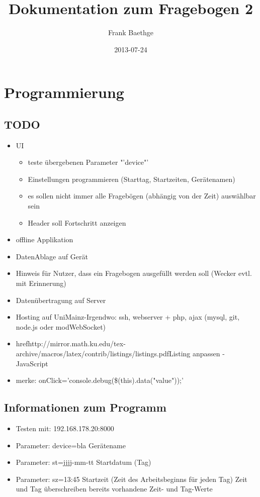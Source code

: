 \documentclass[a4paper]{scrartcl}
\title{Dokumentation zum Fragebogen 2}
\author{Frank Baethge}
\date{2013-07-24}
\begin{document}
	\section{Programmierung}

		\subsection{TODO}
			\begin{itemize}
				\item UI

					\begin{itemize}
						\item teste übergebenen Parameter "'device"'
						\item Einstellungen programmieren (Starttag, Startzeiten, Gerätenamen)
						\item es sollen nicht immer alle Fragebögen (abhängig von der Zeit) auswählbar sein
						\item Header soll Fortschritt anzeigen
					\end{itemize}
				\item offline Applikation
				\item DatenAblage auf Gerät
				\item Hinweis für Nutzer, dass ein Fragebogen ausgefüllt werden soll (Wecker evtl. mit Erinnerung)
				\item Datenübertragung auf Server
				\item Hosting auf UniMainz-Irgendwo: ssh, webserver + php, ajax (mysql, git, node.js oder modWebSocket)
				\item href{http://mirror.math.ku.edu/tex-archive/macros/latex/contrib/listings/listings.pdf}{Listing anpassen - JavaScript} 
				\item merke: onClick='console.debug(\$(this).data("value"));'
			\end{itemize}

		\subsection{Informationen zum Programm}
			\begin{itemize}
				\item Testen mit: 192.168.178.20:8000
				\item Parameter: device=bla \rightarrow Gerätename
				\item Parameter: st=jjjj-mm-tt \rightarrow Startdatum (Tag)
				\item Parameter: sz=13:45 \rightarrow Startzeit (Zeit des Arbeitsbeginns für jeden Tag)\newline
					Zeit und Tag überschreiben bereits vorhandene Zeit- und Tag-Werte
			\end{itemize}
\end{document}
